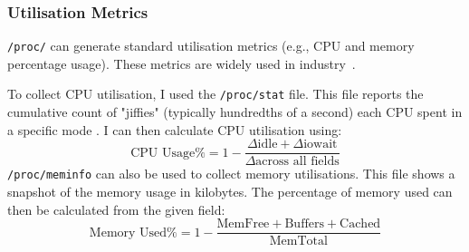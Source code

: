 \subsubsection{Utilisation Metrics}
\texttt{/proc/} can generate standard utilisation metrics (e.g., CPU and memory
percentage usage). These metrics are widely used in
industry~\cite{hadoop2016apache,sahasrabudhe_improved_2015}.

To collect CPU utilisation, I used the \verb|/proc/stat| file. This file reports
the cumulative count of "jiffies" (typically hundredths of a second) each CPU
spent in a specific mode \cite{proc_stat5}. I can then calculate CPU utilisation
using:
\[ \text{CPU Usage\%} = 1 - \frac{\Delta\text{idle} +
\Delta\text{iowait}}{\Delta\text{across all fields}} \]
\verb|/proc/meminfo| can also be used to collect memory utilisations. This file
shows a snapshot of the memory usage in kilobytes. The percentage of memory
used can then be calculated from the given field:
\[ \text{Memory Used\%} = 1 - \frac{\text{MemFree} +
\text{Buffers} + \text{Cached}}{\text{MemTotal}}\]

